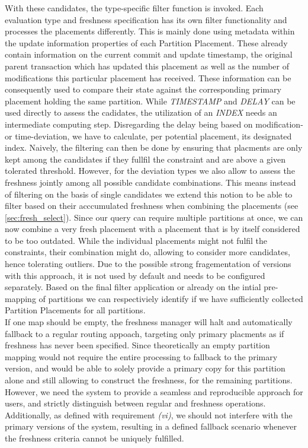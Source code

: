 With these candidates, the type-specific filter function is invoked. Each evaluation type and freshness specification has its own filter functionality and
processes the placements differently. This is mainly done using metadata within the update information properties of each Partition Placement. 
These already contain information on the current commit and update timestamp,
the original parent transaction which has updated this placement as well as the number of modifications this particular placement has received.
These information can be consequently used to compare their state against the corresponding primary placement holding the same partition. 
While \emph{TIMESTAMP} and \emph{DELAY} can be used directly to assess the cadidates, the utilization of an \emph{INDEX} needs an intermediate computing step.
Disregarding the delay being based on modification- or time-deviation, we have to calculate, per potential placement, its designated index.
Naively, the filtering can then be done by ensuring that placments are only kept among the candidates if they fullfil the constraint and are above 
a given tolerated threshold. However, for the deviation types we also allow to assess the freshness jointly among all possible candidate combinations.
This means instead of filtering on the basis of single candidates we extend this notion to be able to filter based on their acccumulated freshness when combining the placements
(see \ref{sec:fresh_select}).
Since our query can require multiple partitions at once, we can now combine a very fresh placement with a placement that is by itself considered to be too outdated.
While the individual placements might not fulfil the constraints, their combination might do, allowing to consider more candidates, hence tolerating outliers.
Due to the possible strong fragementation of versions with this approach, it is not used by default and needs to be configured separately.
Based on the final filter application or already on the intial pre-mapping of partitions we can respectiviely identify if we have sufficiently collected Partition Placements 
for all partitions.\\
If one map should be empty, the freshness manager will halt and automatically fallback to a regular routing appoach, targeting only primary placments 
as if freshness has never been specified.
Since theoretically an empty partition mapping would not require the entire processing to fallback to the primary version, and 
would be able to solely provide a primary copy for this partition alone and still allowing to construct the freshness, 
for the remaining partitions. 
However, we need the system to provide a seamless and reproducible approach for users, and strictly distinguish between regular and freshness operations. 
Additionally, as defined with requirement \textit{(vi)}, we should not interfere with the primary versions of the system, resulting in a defined fallback scenario whenever the freshness
criteria cannot be uniquely fulfilled.



